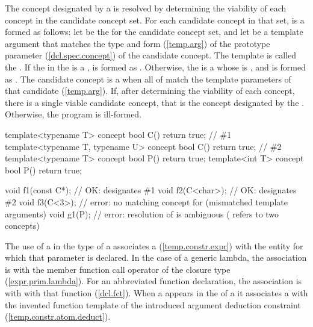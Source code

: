 \pnum
The concept designated by a 
is resolved by determining the viability of each concept in the
candidate concept set.
% 
For each candidate concept in that set,  is a 
 formed as follows:
% 
let  be the 
for the candidate concept set, and let  be a template 
argument that matches
the type and form (\ref{temp.arg}) of the prototype 
parameter (\ref{dcl.spec.concept})
of the candidate concept. 
% 
The template  is called the 
.
% 
If the  in
the  is
a ,  is
formed as .
% 
Otherwise, the  is
a  whose
 is
, and
 is formed as
.
% 
The candidate concept is a  when all
 of  
match the template parameters of that candidate 
(\ref{temp.arg}).
% 
If, after determining the viability of each concept, there is a
single viable candidate concept, that is the concept designated by the
.
% 
Otherwise, the program is ill-formed.
% 
\enterexample
\begin{codeblock}
template<typename T> concept bool C() { return true; }             // \#1
template<typename T, typename U> concept bool C() { return true; } // \#2
template<typename T> concept bool P() { return true; }
template<int T> concept bool P() { return true; }

void f1(const C*); // OK:  designates \#1
void f2(C<char>);  // OK:  designates \#2
void f3(C<3>);     // error: no matching concept for  (mismatched template arguments)
void g1(P);        // error: resolution of  is ambiguous ( refers to two concepts)
\end{codeblock}
\exitexample


\pnum
The use of a 
in the type of a 
associates a  
(\ref{temp.constr.expr}) with the 
entity for which that parameter is declared. 
% 
In the case of a generic lambda, the association is with
the member function call operator of the closure type 
(\ref{expr.prim.lambda}).
% 
For an abbreviated function declaration, the association is with
with that function (\ref{dcl.fct}).
% 
When a 
appears in the 
 of a 
 it
associates a  
with the invented function template of the introduced argument 
deduction constraint (\ref{temp.constr.atom.deduct}).

